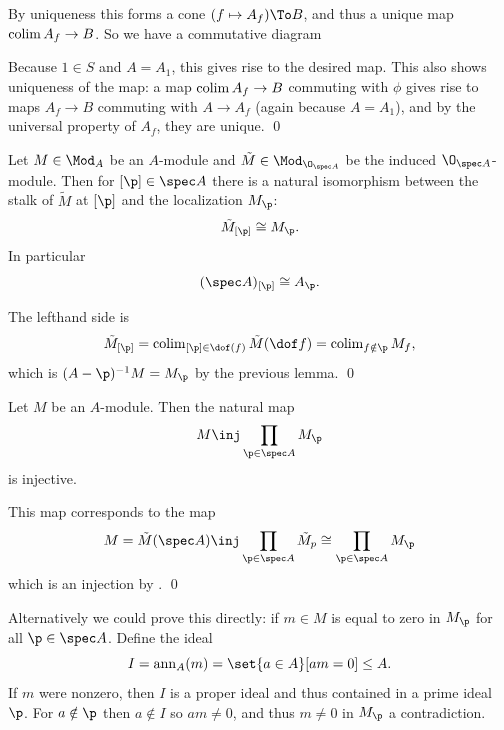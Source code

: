 
    By uniqueness this forms a cone $(f\mapsto A_f)\To B$, and thus a unique map $\mathop{\rm colim}\nolimits A_f\to B$.
    So we have a commutative diagram


    Because $1\in S$ and $A=A_1$, this gives rise to the desired map.
    This also shows uniqueness of the map: a map $\mathop{\rm colim}\nolimits A_f\to B$ commuting with $\phi$ gives rise to maps $A_f\to B$ commuting with $A\to A_f$ (again because $A=A_1$),
    and by the universal property of $A_f$, they are unique.
    \qed

\eproof

\bcoro

    Let $M\in\Mod_A$ be an $A$-module and $\tilde M\in\Mod_{\O_{\spec A}}$ be the induced $\O_{\spec A}$-module.
    Then for $[\p]\in\spec A$ there is a natural isomorphism between the stalk of $\tilde M$ at $[\p]$ and the localization $M_\p$:
    $$ \tilde M_{[\p]} \cong M_\p . $$
    In particular
    $$ (\spec A)_{[\p]} \cong A_\p . $$

\ecoro

\bproof

    The lefthand side is
    $$ \tilde M_{[\p]} = \colim_{[\p]\in\dof(f)}\tilde M(\dof f) = \colim_{f\notin\p}M_f , $$
    which is $(A-\p)^{-1}M=M_\p$ by the previous lemma.
    \qed

\eproof

\bprop

    Let $M$ be an $A$-module.
    Then the natural map
    $$ M \inj \prod_{\p\in\spec A}M_\p $$
    is injective.

\eprop

\bproof

    This map corresponds to the map
    $$ M = \tilde M(\spec A) \inj \prod_{\p\in\spec A}\tilde M_p \cong \prod_{\p\in\spec A}M_\p $$
    which is an injection by .
    \qed

\eproof

\bnote

    Alternatively we could prove this directly: if $m\in M$ is equal to zero in $M_\p$ for all $\p\in\spec A$.
    Define the ideal
    $$ I = {\rm ann}_A(m) = \set{a\in A}[am=0] \leq A . $$
    If $m$ were nonzero, then $I$ is a proper ideal and thus contained in a prime ideal $\p$.
    For $a\notin\p$ then $a\notin I$ so $am\neq0$, and thus $m\neq0$ in $M_\p$ a contradiction.

